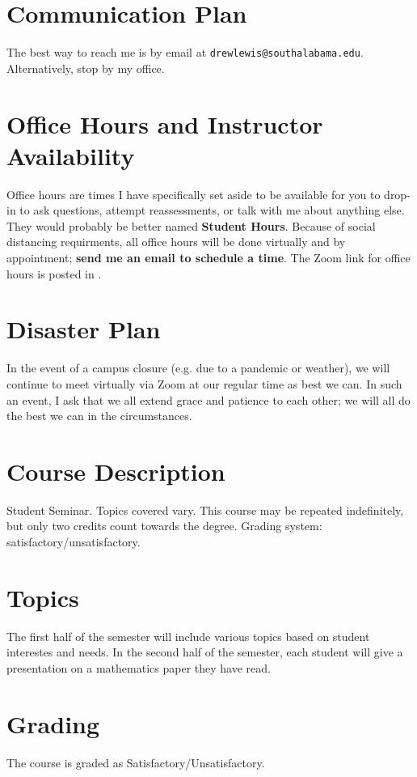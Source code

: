 \documentclass{article}
\begin{document}
\section*{\fontsize{12}{15}\selectfont Communication Plan}

The best way to reach me is by email at {\tt drewlewis@southalabama.edu}. Alternatively, stop by my office.

\section*{\fontsize{12}{15}\selectfont Office Hours and Instructor Availability}

Office hours are times I have specifically set aside to be available for you to drop-in to ask questions, attempt reassessments, or talk with me about anything else. They would probably be better named \textbf{Student Hours}. Because of social distancing requirments, all office hours will be done virtually and by appointment; {\bf send me an email to schedule a time}. The Zoom link for office hours is posted in \LMS.

\section*{\fontsize{12}{15}\selectfont Disaster Plan}
In the event of a campus closure (e.g. due to a pandemic or weather), we will continue to meet virtually via Zoom at our regular time as best we can. In such an event, I ask that we all extend grace and patience to each other; we will all do the best we can in the circumstances.


\section*{\fontsize{12}{15}\selectfont Course Description}
Student Seminar. Topics covered vary. This course may be repeated indefinitely, but only two credits count towards the degree. Grading system: satisfactory/unsatisfactory.


\section*{\fontsize{12}{15}\selectfont Topics}
The first half of the semester will include various topics based on student interestes and needs. In the second half of the semester, each student will give a presentation on a mathematics paper they have read.


\section*{\fontsize{12}{15}\selectfont Grading}
The course is graded as Satisfactory/Unsatisfactory.
\end{document}
